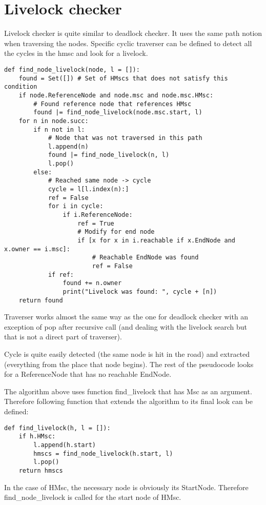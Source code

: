 \documentclass[11pt,oneside]{fithesis2}
\begin{document}
\section{Livelock checker}
Livelock checker is quite similar to deadlock checker. It uses the same path notion when traversing the nodes. Specific cyclic traverser can be defined to detect all the cycles in the hmsc and look for a livelock.
\begin{lstlisting}
def find_node_livelock(node, l = []):
    found = Set([]) # Set of HMscs that does not satisfy this condition
    if node.ReferenceNode and node.msc and node.msc.HMsc:
        # Found reference node that references HMsc
        found |= find_node_livelock(node.msc.start, l)
    for n in node.succ:
        if n not in l:
            # Node that was not traversed in this path
            l.append(n)
            found |= find_node_livelock(n, l)
            l.pop()
        else:
            # Reached same node -> cycle
            cycle = l[l.index(n):]
            ref = False
            for i in cycle:
                if i.ReferenceNode:
                    ref = True
                    # Modify for end node
                    if [x for x in i.reachable if x.EndNode and x.owner == i.msc]:
                        # Reachable EndNode was found
                        ref = False
            if ref:
                found += n.owner
                print("Livelock was found: ", cycle + [n])
    return found
\end{lstlisting}

Traverser works almost the same way as the one for deadlock checker with an exception of pop after recursive call (and dealing with the livelock search but that is not a direct part of traverser).

Cycle is quite easily detected (the same node is hit in the road) and extracted (everything from the place that node begins). The rest of the pseudocode looks for a ReferenceNode that has no reachable EndNode.

The algorithm above uses function find\_livelock that has Msc as an argument. Therefore following function that extends the algorithm to its final look can be defined:
\begin{lstlisting}
def find_livelock(h, l = []):
    if h.HMsc:
        l.append(h.start)
        hmscs = find_node_livelock(h.start, l)
        l.pop()
    return hmscs
\end{lstlisting}
In the case of HMsc, the necessary node is obviously its StartNode. Therefore find\_node\_livelock is called for the start node of HMsc.
\end{document}
